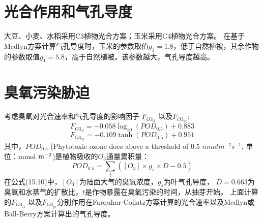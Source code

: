 \section{光合作用和气孔导度}
大豆、小麦、水稻采用C3植物光合方案；玉米采用C4植物光合方案。
在基于Medlyn方案计算气孔导度时，玉米的参数取值$g_1=1.8$，低于自然植被，其余作物的参数取值$g_1=5.8$，高于自然植被。该参数越大，气孔导度越高。

\section{臭氧污染胁迫}
考虑臭氧对光合速率和气孔导度的影响因子 $F_{O3_A}$ 以及$F_{O3_{gs}}$:
\begin{equation}
F_{O3_{A}}=-0.058 \log _{10}\left(POD_{0.5}\right)+0.883
\end{equation}
\begin{equation}
F_{O3_{gs}}=-0.109 \tanh \left(POD_{0.5}\right)+0.951
\end{equation}
其中，$POD_{0.5}$ (Phytotoxic ozone does above a threshold of 0.5 $nmol m^{-2} s^{-1}$,  单位：mmol $\rm m^{-2}$)是植物吸收的$O_3$通量累积量：
\begin{equation}
POD_{0.5}=\sum_{t}\left(\left[{O}_{3}\right] \times g_{s} \times D-0.5\right)
\end{equation}
在公式(15.10)中，$\left[{O}_{3}\right]$为陆面大气的臭氧浓度，$g_{s}$为叶气孔导度，
$D=0.663$为臭氧和水蒸气的扩散比，$t$是作物暴露在臭氧污染的时间，从抽芽开始。
上面计算的$F_{{O3}_A}$ 以及$F_{O3_{gs}}$分别作用在Farquhar-Collatz方案计算的光合速率以及Medlyn或Ball-Berry方案计算出的气孔导度。

